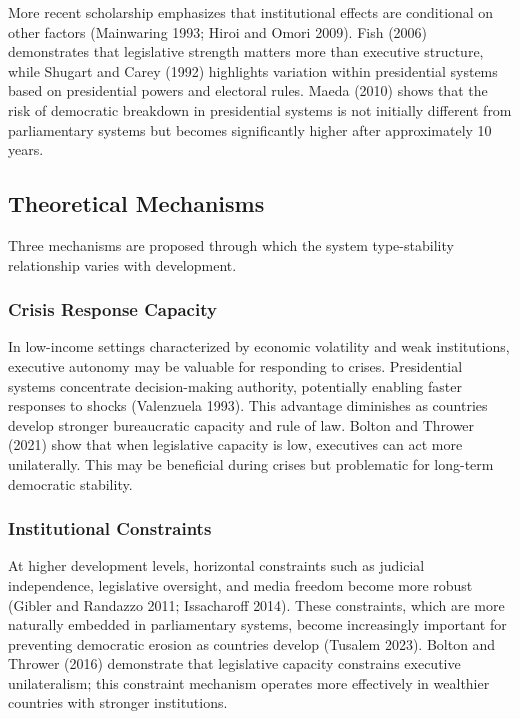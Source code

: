 \documentclass[
  letterpaper,
  DIV=11,
  numbers=noendperiod]{scrartcl}
\begin{document}
More recent scholarship emphasizes that institutional effects are
conditional on other factors (Mainwaring 1993; Hiroi and Omori 2009).
Fish (2006) demonstrates that legislative strength matters more than
executive structure, while Shugart and Carey (1992) highlights variation
within presidential systems based on presidential powers and electoral
rules. Maeda (2010) shows that the risk of democratic breakdown in
presidential systems is not initially different from parliamentary
systems but becomes significantly higher after approximately 10 years.

\subsection{Theoretical Mechanisms}\label{theoretical-mechanisms}

Three mechanisms are proposed through which the system type-stability
relationship varies with development.

\subsubsection{Crisis Response Capacity}\label{crisis-response-capacity}

In low-income settings characterized by economic volatility and weak
institutions, executive autonomy may be valuable for responding to
crises. Presidential systems concentrate decision-making authority,
potentially enabling faster responses to shocks (Valenzuela 1993). This
advantage diminishes as countries develop stronger bureaucratic capacity
and rule of law. Bolton and Thrower (2021) show that when legislative
capacity is low, executives can act more unilaterally. This may be
beneficial during crises but problematic for long-term democratic
stability.

\subsubsection{Institutional
Constraints}\label{institutional-constraints}

At higher development levels, horizontal constraints such as judicial
independence, legislative oversight, and media freedom become more
robust (Gibler and Randazzo 2011; Issacharoff 2014). These constraints,
which are more naturally embedded in parliamentary systems, become
increasingly important for preventing democratic erosion as countries
develop (Tusalem 2023). Bolton and Thrower (2016) demonstrate that
legislative capacity constrains executive unilateralism; this constraint
mechanism operates more effectively in wealthier countries with stronger
institutions.
\end{document}
